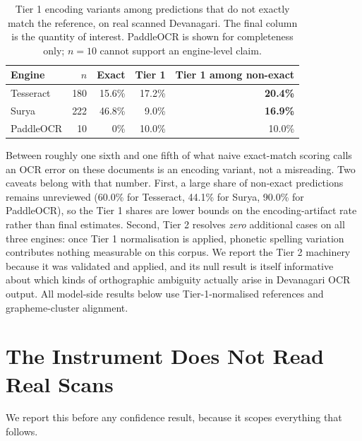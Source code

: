 \documentclass{article}
\begin{document}
\begin{table}[h]
\small
\centering
\caption{Tier 1 encoding variants among predictions that do not exactly match the reference,
on real scanned Devanagari. The final column is the quantity of interest. PaddleOCR is shown
for completeness only; $n=10$ cannot support an engine-level claim.}
\label{tab:tier1}
\begin{tabular}{lrrrr}
\toprule
Engine & $n$ & Exact & Tier 1 & Tier 1 among non-exact \\
\midrule
Tesseract  & 180 & 15.6\% & 17.2\% & \textbf{20.4\%} \\
Surya      & 222 & 46.8\% & 9.0\%  & \textbf{16.9\%} \\
PaddleOCR  & 10  & 0\%    & 10.0\% & 10.0\% \\
\bottomrule
\end{tabular}
\end{table}

Between roughly one sixth and one fifth of what naive exact-match scoring calls an OCR error
on these documents is an encoding variant, not a misreading. Two caveats belong with that
number. First, a large share of non-exact predictions remains unreviewed (60.0\% for
Tesseract, 44.1\% for Surya, 90.0\% for PaddleOCR), so the Tier 1 shares are lower bounds on
the encoding-artifact rate rather than final estimates. Second, Tier 2 resolves \emph{zero}
additional cases on all three engines: once Tier 1 normalisation is applied, phonetic
spelling variation contributes nothing measurable on this corpus. We report the Tier 2
machinery because it was validated and applied, and its null result is itself informative
about which kinds of orthographic ambiguity actually arise in Devanagari OCR output. All
model-side results below use Tier-1-normalised references and grapheme-cluster alignment.

\section{The Instrument Does Not Read Real Scans}
\label{sec:cer}

We report this before any confidence result, because it scopes everything that follows.
\end{document}
